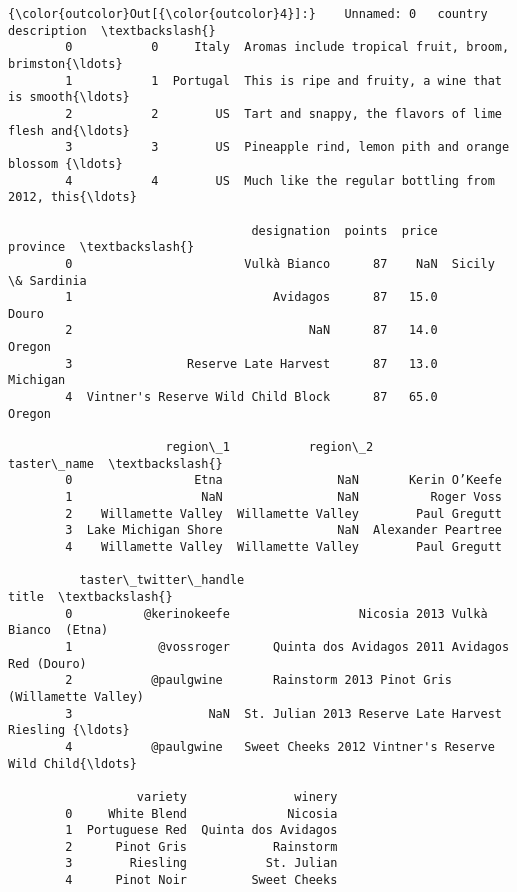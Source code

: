 \documentclass[11pt]{article}
\begin{document}
\begin{Verbatim}[commandchars=\\\{\}]
{\color{outcolor}Out[{\color{outcolor}4}]:}    Unnamed: 0   country                                        description  \textbackslash{}
        0           0     Italy  Aromas include tropical fruit, broom, brimston{\ldots}   
        1           1  Portugal  This is ripe and fruity, a wine that is smooth{\ldots}   
        2           2        US  Tart and snappy, the flavors of lime flesh and{\ldots}   
        3           3        US  Pineapple rind, lemon pith and orange blossom {\ldots}   
        4           4        US  Much like the regular bottling from 2012, this{\ldots}   
        
                                  designation  points  price           province  \textbackslash{}
        0                        Vulkà Bianco      87    NaN  Sicily \& Sardinia   
        1                            Avidagos      87   15.0              Douro   
        2                                 NaN      87   14.0             Oregon   
        3                Reserve Late Harvest      87   13.0           Michigan   
        4  Vintner's Reserve Wild Child Block      87   65.0             Oregon   
        
                      region\_1           region\_2         taster\_name  \textbackslash{}
        0                 Etna                NaN       Kerin O’Keefe   
        1                  NaN                NaN          Roger Voss   
        2    Willamette Valley  Willamette Valley        Paul Gregutt   
        3  Lake Michigan Shore                NaN  Alexander Peartree   
        4    Willamette Valley  Willamette Valley        Paul Gregutt   
        
          taster\_twitter\_handle                                              title  \textbackslash{}
        0          @kerinokeefe                  Nicosia 2013 Vulkà Bianco  (Etna)   
        1            @vossroger      Quinta dos Avidagos 2011 Avidagos Red (Douro)   
        2           @paulgwine       Rainstorm 2013 Pinot Gris (Willamette Valley)   
        3                   NaN  St. Julian 2013 Reserve Late Harvest Riesling {\ldots}   
        4           @paulgwine   Sweet Cheeks 2012 Vintner's Reserve Wild Child{\ldots}   
        
                  variety               winery  
        0     White Blend              Nicosia  
        1  Portuguese Red  Quinta dos Avidagos  
        2      Pinot Gris            Rainstorm  
        3        Riesling           St. Julian  
        4      Pinot Noir         Sweet Cheeks  
\end{Verbatim}
            
\end{document}
